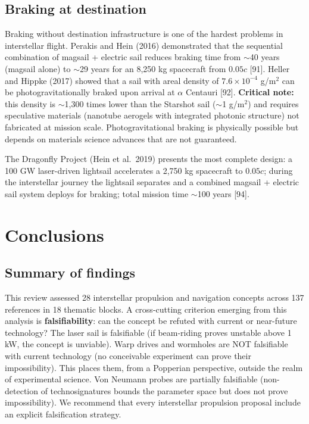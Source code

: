 \documentclass[11pt,a4paper,onecolumn]{article}
\begin{document}
\subsection{Braking at destination}

Braking without destination infrastructure is one of the hardest problems in interstellar flight. Perakis and Hein (2016) demonstrated that the sequential combination of magsail + electric sail reduces braking time from $\sim$40 years (magsail alone) to $\sim$29 years for an 8,250 kg spacecraft from $0.05c$ [91]. Heller and Hippke (2017) showed that a sail with areal density of $7.6\times10^{-4}$ g/m$^2$ can be photogravitationally braked upon arrival at $\alpha$ Centauri [92]. \textbf{Critical note:} this density is $\sim$1,300 times lower than the Starshot sail ($\sim$1 g/m$^2$) and requires speculative materials (nanotube aerogels with integrated photonic structure) not fabricated at mission scale. Photogravitational braking is physically possible but depends on materials science advances that are not guaranteed.

The Dragonfly Project (Hein et al.\ 2019) presents the most complete design: a 100 GW laser-driven lightsail accelerates a 2,750 kg spacecraft to $0.05c$; during the interstellar journey the lightsail separates and a combined magsail + electric sail system deploys for braking; total mission time $\sim$100 years [94].

\section{Conclusions}

\subsection{Summary of findings}

This review assessed 28 interstellar propulsion and navigation concepts across 137 references in 18 thematic blocks. A cross-cutting criterion emerging from this analysis is \textbf{falsifiability}: can the concept be refuted with current or near-future technology? The laser sail is falsifiable (if beam-riding proves unstable above 1 kW, the concept is unviable). Warp drives and wormholes are NOT falsifiable with current technology (no conceivable experiment can prove their impossibility). This places them, from a Popperian perspective, outside the realm of experimental science. Von Neumann probes are partially falsifiable (non-detection of technosignatures bounds the parameter space but does not prove impossibility). We recommend that every interstellar propulsion proposal include an explicit falsification strategy.
\end{document}
